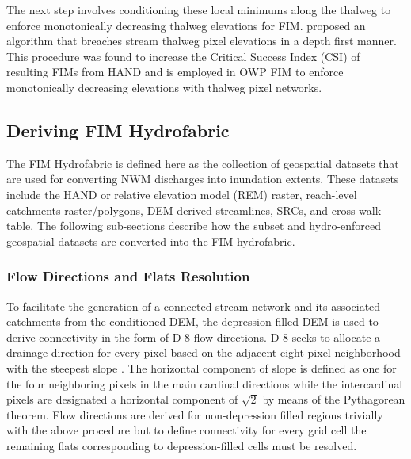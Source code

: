 \documentclass[draft]{dependencies/agujournal2019}
\begin{document}
The next step involves conditioning these local minimums along the thalweg to enforce monotonically decreasing thalweg elevations for FIM.
 proposed an algorithm that breaches stream thalweg pixel elevations in a depth first manner. 
This procedure was found to increase the Critical Success Index (CSI) of resulting FIMs from HAND and is employed in OWP FIM to enforce monotonically decreasing elevations with thalweg pixel networks.
%
\subsection{Deriving FIM Hydrofabric}
\label{ssec:deriving_fim_hydrofabric}
%
The FIM Hydrofabric is defined here as the collection of geospatial datasets that are used for converting NWM discharges into inundation extents.
These datasets include the HAND or relative elevation model (REM) raster, reach-level catchments raster/polygons, DEM-derived streamlines, SRCs, and cross-walk table.
The following sub-sections describe how the subset and hydro-enforced geospatial datasets are converted into the FIM hydrofabric.
%
\subsubsection{Flow Directions and Flats Resolution}
\label{ssec:flow_direction_and_flat_resolution}
%
To facilitate the generation of a connected stream network and its associated catchments from the conditioned DEM, the depression-filled DEM is used to derive connectivity in the form of D-8 flow directions.
D-8 seeks to allocate a drainage direction for every pixel based on the adjacent eight pixel neighborhood with the steepest slope \cite{o1984extraction}.
The horizontal component of slope is defined as one for the four neighboring pixels in the main cardinal directions while the intercardinal pixels are designated a horizontal component of $\sqrt{2}$ by means of the Pythagorean theorem. 
Flow directions are derived for non-depression filled regions trivially with the above procedure but to define connectivity for every grid cell the remaining flats corresponding to depression-filled cells must be resolved.
\end{document}
